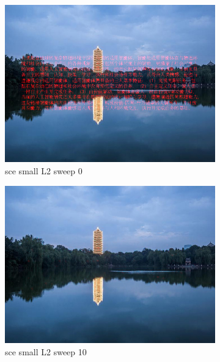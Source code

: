 \documentclass[11pt]{article}
\begin{document}
\begin{figure}[ht!]
    \centering
    \hfill%
    \begin{subfigure}[]{0.333\linewidth}
        \centering
        \includegraphics[width=\linewidth]{fig/restoration/sce_small/L2/gibbs_0.jpg}
        \caption{sce small L2 sweep 0}
    \end{subfigure}%
    \hfill%
    \begin{subfigure}[]{0.333\linewidth}
        \centering
        \includegraphics[width=\linewidth]{fig/restoration/sce_small/L2/gibbs_10.jpg}
        \caption{sce small L2 sweep 10}
    \end{subfigure}%
    \hfill%
    \begin{subfigure}[]{0.333\linewidth}

\end{subfigure}
\end{figure}
\end{document}
